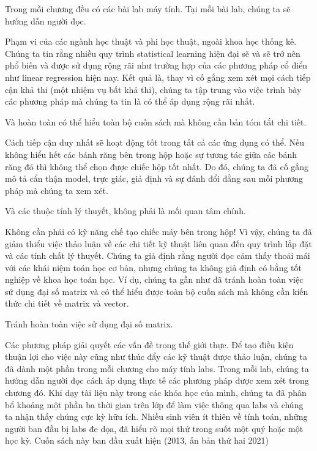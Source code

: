 Trong mỗi chương đều có các bài lab máy tính. Tại mỗi bài lab, chúng ta sẽ hướng dẫn người đọc.

Phạm vi của các ngành học thuật và phi học thuật, ngoài khoa học thống kê. Chúng ta tin rằng nhiều quy trình statistical learning hiện đại sẽ và sẽ trở nên phổ biến và được sử dụng rộng rãi như trường hợp của các phương pháp cổ điển như linear regression hiện nay. Kết quả là, thay vì cố gắng xem xét mọi cách tiếp cận khả thi (một nhiệm vụ bất khả thi), chúng ta tập trung vào việc trình bày các phương pháp mà chúng ta tin là có thể áp dụng rộng rãi nhất.

Và hoàn toàn có thể hiểu toàn bộ cuốn sách mà không cần bản tóm tắt chi tiết.

Cách tiếp cận duy nhất sẽ hoạt động tốt trong tất cả các ứng dụng có thể. Nếu không hiểu hết các bánh răng bên trong hộp hoặc sự tương tác giữa các bánh răng đó thì không thể chọn được chiếc hộp tốt nhất. Do đó, chúng ta đã cố gắng mô tả cẩn thận model, trực giác, giả định và sự đánh đổi đằng sau mỗi phương pháp mà chúng ta xem xét.

Và các thuộc tính lý thuyết, không phải là mối quan tâm chính.

Không cần phải có kỹ năng chế tạo chiếc máy bên trong hộp! Vì vậy, chúng ta đã giảm thiểu việc thảo luận về các chi tiết kỹ thuật liên quan đến quy trình lắp đặt và các tính chất lý thuyết. Chúng ta giả định rằng người đọc cảm thấy thoải mái với các khái niệm toán học cơ bản, nhưng chúng ta không giả định có bằng tốt nghiệp về khoa học toán học. Ví dụ, chúng ta gần như đã tránh hoàn toàn việc sử dụng đại số matrix và có thể hiểu được toàn bộ cuốn sách mà không cần kiến ​​thức chi tiết về matrix và vector.

Tránh hoàn toàn việc sử dụng đại số matrix.

Các phương pháp giải quyết các vấn đề trong thế giới thực. Để tạo điều kiện thuận lợi cho việc này cũng như thúc đẩy các kỹ thuật được thảo luận, chúng ta đã dành một phần trong mỗi chương cho máy tính labs. Trong mỗi lab, chúng ta hướng dẫn người đọc cách áp dụng thực tế các phương pháp được xem xét trong chương đó. Khi dạy tài liệu này trong các khóa học của mình, chúng ta đã phân bổ khoảng một phần ba thời gian trên lớp để làm việc thông qua labs và chúng ta nhận thấy chúng cực kỳ hữu ích. Nhiều sinh viên ít thiên về tính toán, những người ban đầu bị labs đe dọa, đã hiểu rõ mọi thứ trong suốt một quý hoặc một học kỳ. Cuốn sách này ban đầu xuất hiện (2013, ấn bản thứ hai 2021)

